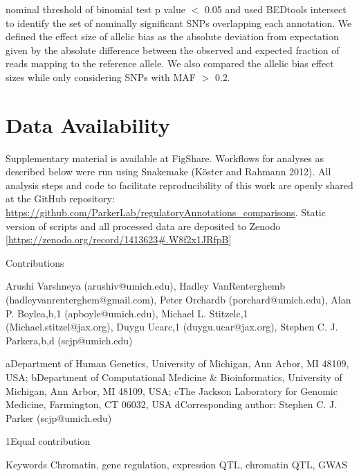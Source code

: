 nominal threshold of binomial test p value $<$ 0.05 and used BEDtools intersect to identify the set of nominally significant SNPs overlapping each annotation. We defined the effect size of allelic bias as the absolute deviation from expectation given by the absolute difference between the observed and expected fraction of reads mapping to the reference allele. We also compared the allelic bias effect sizes while only considering SNPs with MAF $>$ 0.2.

\section{Data Availability}
Supplementary material is available at FigShare. Workflows for analyses as described below were run using Snakemake (Köster and Rahmann 2012). All analysis steps and code to facilitate reproducibility of this work are openly shared at the GitHub repository:  \url{https://github.com/ParkerLab/regulatoryAnnotations_comparisons}. Static version of scripts and all processed data are deposited to Zenodo [\url{https://zenodo.org/record/1413623#.W8f2x1JRfpB}]


Contributions

Arushi Varshneya (arushiv@umich.edu), Hadley VanRenterghemb (hadleyvanrenterghem@gmail.com), Peter Orchardb (porchard@umich.edu), Alan P. Boylea,b,1 (apboyle@umich.edu), Michael L. Stitzelc,1 (Michael.stitzel@jax.org), Duygu Ucarc,1 (duygu.ucar@jax.org), Stephen C. J. Parkera,b,d (scjp@umich.edu)

aDepartment of Human Genetics, University of Michigan, Ann Arbor, MI 48109, USA;
bDepartment of Computational Medicine & Bioinformatics, University of Michigan, Ann Arbor, MI 48109, USA;
cThe Jackson Laboratory for Genomic Medicine, Farmington, CT 06032, USA
dCorresponding author: Stephen C. J. Parker (scjp@umich.edu)

1Equal contribution


Keywords
Chromatin, gene regulation, expression QTL, chromatin QTL, GWAS 






